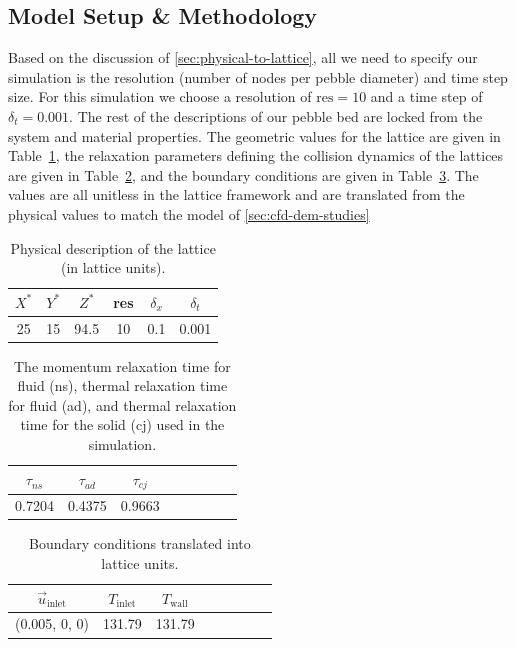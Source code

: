 \subsection{Model Setup \& Methodology}

Based on the discussion of \cref{sec:physical-to-lattice}, all we need to specify our simulation is the resolution (number of nodes per pebble diameter) and time step size. For this simulation we choose a resolution of $\text{res} = 10$ and a time step of $\delta_t = 0.001$. The rest of the descriptions of our pebble bed are locked from the system and material properties. The geometric values for the lattice are given in Table~\ref{tab:lbm-parameters}, the relaxation parameters defining the collision dynamics of the lattices are given in Table~\ref{tab:lbm-relaxations}, and the boundary conditions are given in Table~\ref{tab:lbm-boundaries}. The values are all unitless in the lattice framework and are translated from the physical values to match the model of \cref{sec:cfd-dem-studies}

\begin {table}[htp] %
\caption{Physical description of the lattice (in lattice units).}
\label{tab:lbm-parameters} \centering %
\begin {tabular}{ cccccc }
\toprule %
$X^*$   &   $Y^*$  &   $Z^*$    &   res  & $\delta_x$   & $\delta_t$    \\\toprule
25      &   15     &   94.5     &   10   &  0.1         &  0.001        \\\bottomrule
\end{tabular}
\end{table}

\begin {table}[htp] %
\caption{The momentum relaxation time for fluid (ns), thermal relaxation time for fluid (ad), and thermal relaxation time for the solid (cj) used in the simulation.}
\label{tab:lbm-relaxations} \centering %
\begin {tabular}{ cccccccc }
\toprule %
$\tau_{ns}$ &  $\tau_{ad}$  &   $\tau_{cj}$     \\\toprule
0.7204      &  0.4375       &   0.9663          \\\bottomrule
\end{tabular}
\end{table}

\begin {table}[htp] %
\caption{Boundary conditions translated into lattice units.}
\label{tab:lbm-boundaries} \centering %
\begin {tabular}{ cccccccc }
\toprule %
$\vec{u}_\text{inlet}$    &  $T_\text{inlet}$   &  $T_\text{wall}$     \\\toprule
(0.005, 0, 0)           &  131.79           &   131.79          \\\bottomrule
\end{tabular}
\end{table}


